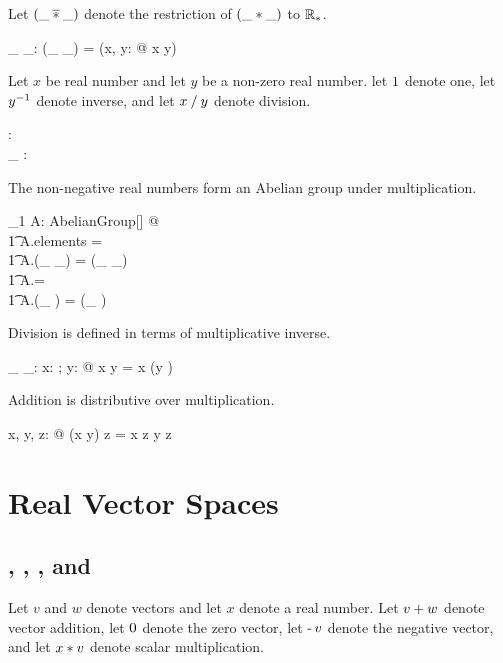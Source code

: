\documentclass[12pt]{article}
\begin{document}
Let $(\_ \mathbin{\overline{*}} \_)$ denote the restriction of $(\_ \mathbin{*} \_)$ to $\mathbb{R}_{*}$.

\begin{axdef}
\_ \mulRnz \_: \Rnz \cross \Rnz \fun \Rnz
\where
(\_ \mulRnz \_) = (\lambda x, y: \Rnz @ x \mulR y)
\end{axdef}

Let $x$ be real number and let $y$ be a non-zero real number.
let $1$ denote one,
let $y ^{-1}$ denote inverse,
and let $x \mathbin{/} y$ denote division.

\begin{axdef}
\oneR: \Rnz \\
\_ \invRnz: \Rnz \fun \Rnz
\end{axdef}

The non-negative real numbers form an Abelian group under multiplication.

\begin{zed}
\exists_1 A: AbelianGroup[\Rnz] @ \\
\t1	A.elements = \Rnz \land \\
\t1	A.(\_ \mulG \_) = (\_ \mulRnz \_) \land \\
\t1	A.\oneG = \oneR \land \\
\t1	A.(\_ \invG) = (\_ \invRnz)
\end{zed}

Division is defined in terms of multiplicative inverse.

\begin{axdef}
\_ \divR \_: \RR \cross \Rnz \fun \RR
\where
\forall x: \RR; y: \Rnz @ x \divR y = x \mulR (y \invRnz)
\end{axdef}

Addition is distributive over multiplication.

\begin{zed}
\forall x, y, z: \RR @ (x \addR y) \mulR z = x \mulR z \addR y \mulR z
\end{zed}

\section{Real Vector Spaces}

\subsection{, , , and }

Let $v$ and $w$ denote vectors and let $x$ denote a real number.
Let $v \mathbin{+} w$ denote vector addition, 
let $0$ denote the zero vector, 
let $\operatorname{-} v$ denote the negative vector,
and let $x \mathbin{*} v$ denote scalar multiplication.
\end{document}

